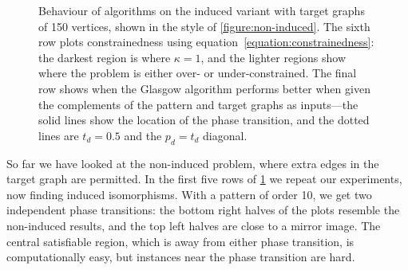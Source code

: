 \documentclass[twoside,11pt]{article}
\begin{document}
\begin{figure}[p]
    \caption{Behaviour of algorithms on the induced variant with target graphs of 150 vertices,
    shown in the style of \cref{figure:non-induced}. The sixth row plots constrainedness using
    equation~\eqref{equation:constrainedness}: the darkest region is where $\kappa = 1$, and the
    lighter regions show where the problem is either over- or under-constrained. The final row shows
    when the Glasgow algorithm performs better when given the complements of the pattern and target
    graphs as inputs---the solid lines show the location of the phase transition, and the dotted
    lines are $t_d=0.5$ and the $p_d=t_d$ diagonal.}\label{figure:induced}
\end{figure}

So far we have looked at the non-induced problem, where extra edges in the target graph are
permitted.  In the first five rows of \cref{figure:induced} we repeat our experiments, now finding
induced isomorphisms. With a pattern of order 10, we get two independent phase transitions: the
bottom right halves of the plots resemble the non-induced results, and the top left halves are close
to a mirror image. The central satisfiable region, which is away from either phase transition, is
computationally easy, but instances near the phase transition are hard.
\end{document}
